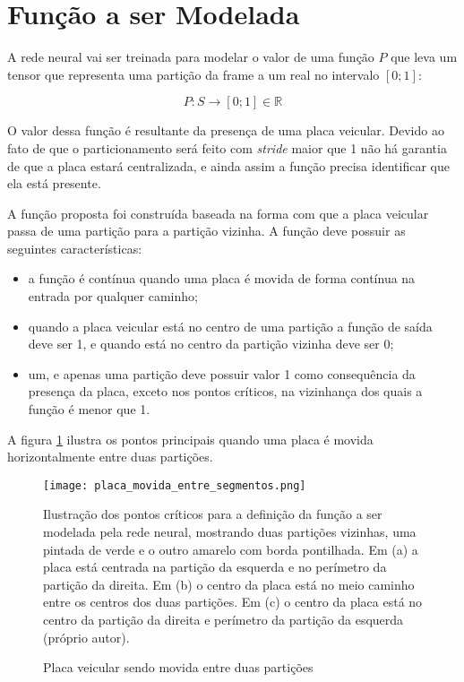 \section{Função a ser Modelada} \label{ses:funcao_a_modelar}

A rede neural vai ser treinada para modelar o valor de uma função $P$ que
leva um tensor que representa uma partição da frame a um real no intervalo
$[0;1]$:

\begin{equation}
	P:S \to [0;1] \in \mathbb{R} 
\end{equation}

O valor dessa função é resultante da presença de uma placa veicular. Devido ao
fato de que o particionamento será feito com \emph{stride} maior que 1 não há
garantia de que a placa estará centralizada, e ainda assim a função precisa
identificar que ela está presente.

A função proposta foi construída baseada na forma com que a placa veicular
passa de uma partição para a partição vizinha. A função deve possuir as
seguintes características:

\begin{itemize}
\item a função é contínua quando uma placa é movida de forma contínua na
	entrada por qualquer caminho;
\item quando a placa veicular está no centro de uma partição a função de
	saída deve ser 1, e quando está no centro da partição vizinha deve ser 0;
\item um, e apenas uma partição deve possuir valor 1 como consequência da
	presença da placa, exceto nos pontos críticos, na vizinhança dos quais a
	função é menor que 1.
\end{itemize}

A figura \ref{fig:placa_movida_entre_segmentos} ilustra os pontos principais
quando uma placa é movida horizontalmente entre duas partições.

\begin{figure}[!htb]
	\centering
	\texttt{[image: placa\_movida\_entre\_segmentos.png]}
	\caption{Placa veicular sendo movida entre duas partições}
	\label{fig:placa_movida_entre_segmentos}
	Ilustração dos pontos críticos para a definição da função a ser modelada
	pela rede neural, mostrando duas partições vizinhas, uma pintada de verde e
	o outro amarelo com borda pontilhada. Em (a) a placa está centrada na
	partição da esquerda e no perímetro da partição da direita.
	Em (b) o centro da placa está no meio caminho entre os centros dos duas
	partições. Em (c) o centro da placa está no centro da partição da direita e
	perímetro da partição da esquerda (próprio autor).
\end{figure}

